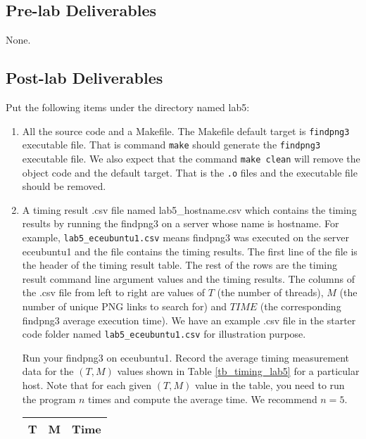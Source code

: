 \subsection{Pre-lab Deliverables}
None.
\subsection{Post-lab Deliverables}
\label{sec:lab5:postlab}
Put the following items under the directory named lab5:
\begin{enumerate}
\item All the source code and a Makefile. The Makefile default target is \verb+findpng3+ executable file. That is command \verb+make+ should generate the \verb+findpng3+ executable file. We also expect that the command \verb+make clean+ will remove the object code and the default target. That is the \verb+.o+ files and the executable file should be removed.
\item A timing result .csv file named lab5\_hostname.csv 
  which contains the timing results by running the findpng3 on a server whose name is hostname. For example, \verb+lab5_eceubuntu1.csv+ means findpng3 was executed on the server eceubuntu1 and the file contains the timing results.
  The first line of the file is the header of the timing result table. The rest of the rows are the timing result command line argument values and the timing results. The columns of the .csv file from left to right are values of $T$ (the number of threads), $M$ (the number of unique PNG links to search for) and $TIME$ (the corresponding findpng3 average execution time). We have an example .csv file in the starter code folder named \verb+lab5_eceubuntu1.csv+ for illustration purpose.

  Run your findpng3 on eceubuntu1. Record the average timing measurement data for the $(T, M)$ values shown in Table \ref{tb_timing_lab5} for a particular host. Note that for each given $(T, M)$ value in the table, you need to run the program $n$ times and compute the average time. We recommend $n=5$.
\begin{table}[h]
\begin{center}
\begin{tabular}{|c|c|c|}
\hline
T     & M    & Time \\ \hline


\end{tabular}
\end{center}
\end{table}
\end{enumerate}
